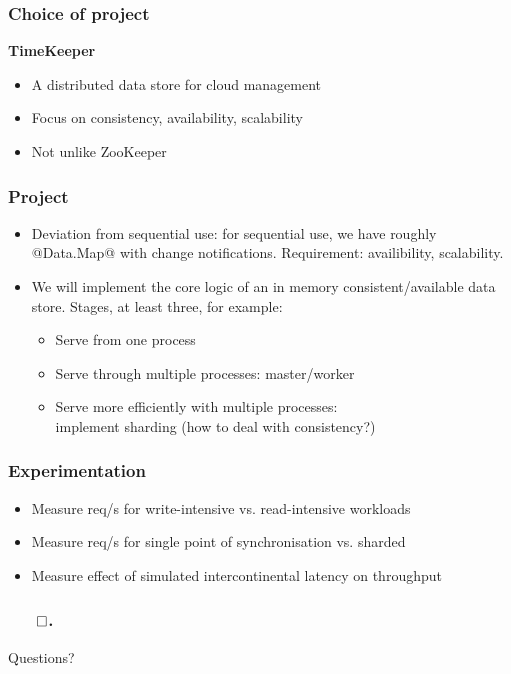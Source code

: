 \documentclass{beamer}
\begin{document}
\begin{frame}
\frametitle{Choice of project}

{\Large \textbf{TimeKeeper} }
  \begin{itemize}
    \item A distributed data store for cloud management
    \item Focus on consistency, availability, scalability
    \item Not unlike ZooKeeper
  \end{itemize}

\end{frame}


\begin{frame}
\frametitle{Project}

\begin{itemize}
  \item Deviation from sequential use: for sequential use, we have roughly @Data.Map@ with change notifications. Requirement: availibility, scalability.
  \item We will implement the core logic of an in memory consistent/available data store. Stages, at least three, for example:
    \begin{itemize}
      \item Serve from one process
      \item Serve through multiple processes: master/worker
      \item Serve more efficiently with multiple processes: \\ implement sharding (how to deal with consistency?)
    \end{itemize}
  \end{itemize}
\end{frame}

\begin{frame}
\frametitle{Experimentation}
  \begin{itemize}
    \item Measure req/s for write-intensive vs. read-intensive workloads
    \item Measure req/s for single point of synchronisation vs. sharded
    \item Measure effect of simulated intercontinental latency on throughput
  \end{itemize}
\end{frame}


\begin{frame}
\frametitle{$\qed$.}
Questions?

\end{frame}
\end{document}
